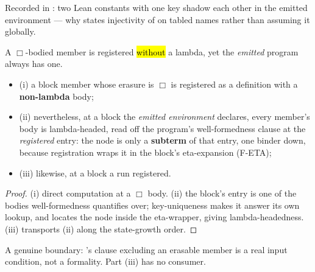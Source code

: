 \begin{remark}
 Recorded in : two Lean constants with one \lbox{} key shadow each
other in the emitted environment --- why  states injectivity of  on
tabled names rather than assuming it globally.
\end{remark}

\begin{lemma}
\label{lem:run_mkDef_box_not_lambda}
\leanok
{}
 A $\Box$-bodied member is registered \hl{without} a lambda, yet the \emph{emitted}
program always has one.
\begin{itemize}
\item (i) a block member whose erasure is $\Box$ is registered as a definition with a \textbf{non-lambda}
body;
\item (ii) nevertheless, at a block the \emph{emitted environment} declares, every member's body is
lambda-headed, read off the program's well-formedness clause at the \emph{registered} entry: the
 node is only a \textbf{subterm} of that entry, one binder down, because registration wraps it
in the block's eta-expansion (F-ETA);
\item (iii) likewise, at a block a run registered.
\end{itemize}
\end{lemma}
\begin{proof}
\leanok
{}
 (i) direct computation at a $\Box$ body. (ii) the block's entry is one of the bodies
well-formedness quantifies over; key-uniqueness makes it answer its own lookup, and
 locates the  node inside the eta-wrapper, giving
lambda-headedness. (iii) transports (ii) along the state-growth order.
\end{proof}

\begin{remark}
 A genuine boundary: 's clause excluding an erasable member is a real
input condition, not a formality. Part (iii) has no consumer.
\end{remark}

